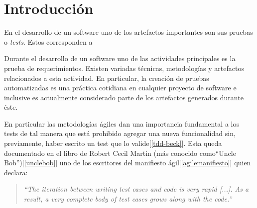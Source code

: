 \chapter{Introducción} 

\par En el desarrollo de un software uno de los artefactos importantes son sus pruebas o \emph{tests}. Estos corresponden a 


 Durante el desarrollo de un software uno de las actividades principales es la prueba de requerimientos. Existen variadas técnicas, metodologías y artefactos relacionados a esta actividad. En particular, la creación de pruebas automatizadas es una práctica cotidiana en cualquier proyecto de software e inclusive es actualmente considerado parte de los artefactos generados durante éste. \\

\par En particular las metodologías ágiles dan una importancia fundamental a los tests de tal manera que está prohibido agregar una nueva funcionalidad sin, previamente, haber escrito un test que lo valide[\ref{tdd-beck}]. Esta queda documentado en el libro de Robert Cecil Martin (más conocido como``Uncle Bob'')[\ref{unclebob}] uno de los escritores del manifiesto ágil[\ref{agilemanifiesto}] quien declara:

\begin{quote}
\emph{``The iteration between writing test cases and code is very rapid [...]. As a result, a very complete body of test cases grows along with the code.''}
\end{quote}




